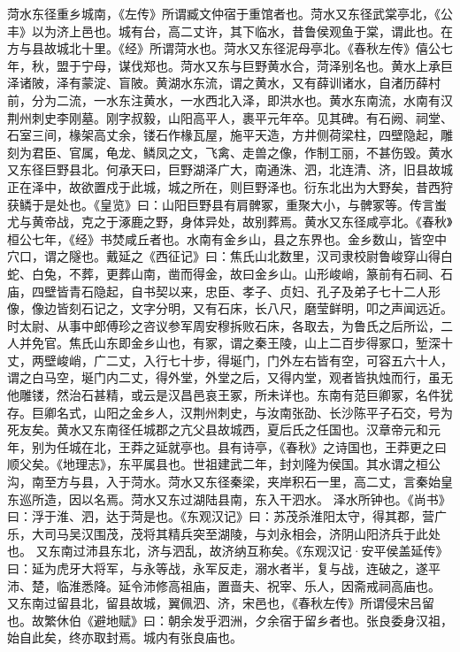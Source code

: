 \documentclass[12pt,UTF8]{ctexbook}
\begin{document}
菏水东径重乡城南，《左传》所谓臧文仲宿于重馆者也。菏水又东径武棠亭北，《公丰》以为济上邑也。城有台，高二丈许，其下临水，昔鲁侯观鱼于棠，谓此也。在方与县故城北十里。《经》所谓菏水也。菏水又东径泥母亭北。《春秋左传》僖公七年，秋，盟于宁母，谋伐郑也。菏水又东与巨野黄水合，菏泽别名也。黄水上承巨泽诸陂，泽有蒙淀、盲陂。黄湖水东流，谓之黄水，又有薛训诸水，自渚历薛村前，分为二流，一水东注黄水，一水西北入泽，即洪水也。黄水东南流，水南有汉荆州刺史李刚墓。刚字叔毅，山阳高平人，裹平元年卒。见其碑。有石阙、祠堂、石室三间，椽架高丈余，镂石作椽瓦屋，施平天造，方井侧荷梁柱，四壁隐起，雕刻为君臣、官属，龟龙、鳞凤之文，飞禽、走兽之像，作制工丽，不甚伤毁。黄水又东径巨野县北。何承天曰，巨野湖泽广大，南通洙、泗，北连清、济，旧县故城正在泽中，故欲置戍于此城，城之所在，则巨野泽也。衍东北出为大野矣，昔西狩获鳞于是处也。《皇览》曰：山阳巨野县有肩髀冢，重聚大小，与髀冢等。传言蚩尤与黄帝战，克之于涿鹿之野，身体异处，故别葬焉。黄水又东径咸亭北。《春秋》桓公七年，《经》书焚咸丘者也。水南有金乡山，县之东界也。金乡数山，皆空中穴口，谓之隧也。戴延之《西征记》曰：焦氏山北数里，汉司隶校尉鲁峻穿山得白蛇、白兔，不葬，更葬山南，凿而得金，故曰金乡山。山形峻峭，篆前有石祠、石庙，四壁皆青石隐起，自书契以来，忠臣、孝子、贞妇、孔子及弟子七十二人形像，像边皆刻石记之，文字分明，又有石床，长八尺，磨莹鲜明，叩之声闻远近。时太尉、从事中郎傅珍之咨议参军周安穆拆败石床，各取去，为鲁氏之后所讼，二人并免官。焦氏山东即金乡山也，有冢，谓之秦王陵，山上二百步得冢口，堑深十丈，两壁峻峭，广二丈，入行七十步，得埏门，门外左右皆有空，可容五六十人，谓之白马空，埏门内二丈，得外堂，外堂之后，又得内堂，观者皆执烛而行，虽无他雕镂，然治石甚精，或云是汉昌邑哀王冢，所未详也。东南有范巨卿冢，名件犹存。巨卿名式，山阳之金乡人，汉荆州刺史，与汝南张劭、长沙陈平子石交，号为死友矣。黄水又东南径任城郡之亢父县故城西，夏后氏之任国也。汉章帝元和元年，别为任城在北，王莽之延就亭也。县有诗亭，《春秋》之诗国也，王莽更之曰顺父矣。《地理志》，东平属县也。世祖建武二年，封刘隆为侯国。其水谓之桓公沟，南至方与县，入于菏水。菏水又东径秦梁，夹岸积石一里，高二丈，言秦始皇东巡所造，因以名焉。菏水又东过湖陆县南，东入干泗水。
泽水所钟也。《尚书》曰：浮于淮、泗，达于菏是也。《东观汉记》曰：苏茂杀淮阳太守，得其郡，营广乐，大司马吴汉围茂，茂将其精兵突至湖陵，与刘永相会，济阴山阳济兵于此处也。
又东南过沛县东北，济与泗乱，故济纳互称矣。《东观汉记·安平侯盖延传》曰：延为虎牙大将军，与永等战，永军反走，溺水者半，复与战，连破之，遂平沛、楚，临淮悉降。延令沛修高祖庙，置啬夫、祝宰、乐人，因斋戒祠高庙也。
又东南过留县北，留县故城，翼佩泗、济，宋邑也，《春秋左传》所谓侵宋吕留也。故繁休伯《避地赋》曰：朝余发乎泗洲，夕余宿于留乡者也。张良委身汉祖，始自此矣，终亦取封焉。城内有张良庙也。
\end{document}
